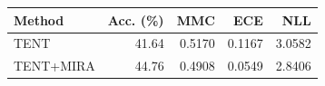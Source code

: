 \begin{tabular}{lrrrr}
\toprule
Method & Acc. (\%) & MMC & ECE & NLL \\
\midrule
TENT & 41.64 & 0.5170 & 0.1167 & 3.0582 \\
TENT+MIRA & 44.76 & 0.4908 & 0.0549 & 2.8406 \\
\bottomrule
\end{tabular}
